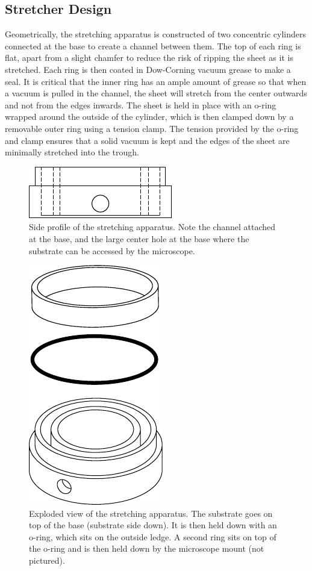 \subsection{Stretcher Design}
Geometrically, the stretching apparatus is constructed of two concentric cylinders connected at the base to create a channel between them. The top of each ring is flat, apart from a slight chamfer to reduce the risk of ripping the sheet as it is stretched. Each ring is then coated in Dow-Corning vacuum grease to make a seal. It is critical that the inner ring has an ample amount of grease so that when a vacuum is pulled in the channel, the sheet will stretch from the center outwards  and not from the edges inwards. The sheet is held in place with an o-ring wrapped around the outside of the cylinder, which is then clamped down by a removable outer ring using a tension clamp. The tension provided by the o-ring and clamp ensures that a solid vacuum is kept and the edges of the sheet are minimally stretched into the trough.
\begin{figure}[h!]
	\centering
	\includegraphics[width=0.6\linewidth]{Chapters/Figures/stretcher_side}
	\caption[Side Profile of Stretching Apparatus]{Side profile of the stretching apparatus. Note the channel attached at the base, and the large center hole at the base where the substrate can be accessed by the microscope.}
	\label{fig:stretcherside}
\end{figure}

\begin{figure}[h!]
	\centering
	\includegraphics[width=.35\linewidth]{Chapters/Figures/exploded_stretcher}
	\caption[Stretching Apparatus Design]{Exploded view of the stretching apparatus. The substrate goes on top of the base (substrate side down). It is then held down with an o-ring, which sits on the outside ledge. A second ring sits on top of the o-ring and is then held down by the microscope mount (not pictured).}
	\label{fig:explodedstretcher}
\end{figure}


